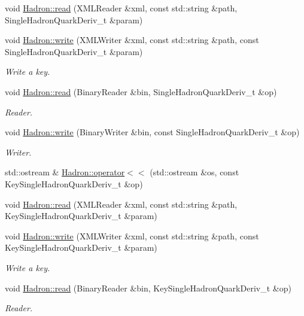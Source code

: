 \begin{DoxyCompactItemize}
\item 
void \mbox{\hyperlink{namespaceHadron_a0b9e3ade4af9d7765000d9cd6477956e}{Hadron\+::read}} (X\+M\+L\+Reader \&xml, const std\+::string \&path, Single\+Hadron\+Quark\+Deriv\+\_\+t \&param)
\item 
void \mbox{\hyperlink{namespaceHadron_a2e0c9a892aa8790addf90c28db1eaf28}{Hadron\+::write}} (X\+M\+L\+Writer \&xml, const std\+::string \&path, const Single\+Hadron\+Quark\+Deriv\+\_\+t \&param)
\begin{DoxyCompactList}\small\item\em Write a key. \end{DoxyCompactList}\item 
void \mbox{\hyperlink{namespaceHadron_ad5dee2ca1e22f01bd860ef607035e36f}{Hadron\+::read}} (Binary\+Reader \&bin, Single\+Hadron\+Quark\+Deriv\+\_\+t \&op)
\begin{DoxyCompactList}\small\item\em Reader. \end{DoxyCompactList}\item 
void \mbox{\hyperlink{namespaceHadron_aca06b6220f81ed284c829138c237b84e}{Hadron\+::write}} (Binary\+Writer \&bin, const Single\+Hadron\+Quark\+Deriv\+\_\+t \&op)
\begin{DoxyCompactList}\small\item\em Writer. \end{DoxyCompactList}\item 
std\+::ostream \& \mbox{\hyperlink{namespaceHadron_a4875d0c001c7eed8b1cb2f65a5e9fb6f}{Hadron\+::operator$<$$<$}} (std\+::ostream \&os, const Key\+Single\+Hadron\+Quark\+Deriv\+\_\+t \&op)
\item 
void \mbox{\hyperlink{namespaceHadron_a41f47831ad3fb4b08af916cdee176a33}{Hadron\+::read}} (X\+M\+L\+Reader \&xml, const std\+::string \&path, Key\+Single\+Hadron\+Quark\+Deriv\+\_\+t \&param)
\item 
void \mbox{\hyperlink{namespaceHadron_ad598d89ca80f65de661af491b2ee51e2}{Hadron\+::write}} (X\+M\+L\+Writer \&xml, const std\+::string \&path, const Key\+Single\+Hadron\+Quark\+Deriv\+\_\+t \&param)
\begin{DoxyCompactList}\small\item\em Write a key. \end{DoxyCompactList}\item 
void \mbox{\hyperlink{namespaceHadron_a14726c9fa76350682d7ef85457af512b}{Hadron\+::read}} (Binary\+Reader \&bin, Key\+Single\+Hadron\+Quark\+Deriv\+\_\+t \&op)
\begin{DoxyCompactList}\small\item\em Reader. \end{DoxyCompactList}\item 

\end{DoxyCompactItemize}
